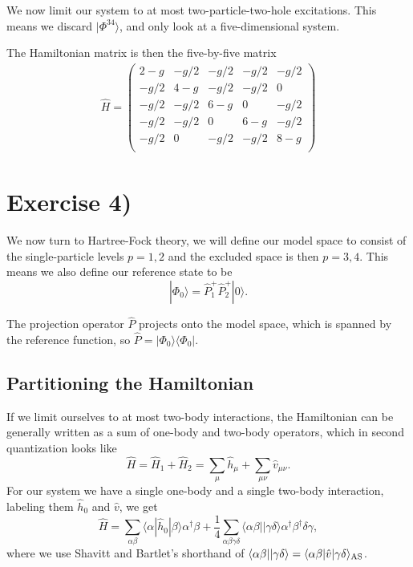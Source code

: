 \documentclass[a4paper, 11pt, notitlepage, english]{article}
\newcommand{\bra}[1]{\langle #1|}
\newcommand{\ket}[1]{|#1 \rangle}
\newcommand{\brakket}[2]{\langle #1 || #2 \rangle}
\newcommand{\op}[1]{\hat{#1}}
\newcommand{\braopket}[3]{\langle #1 | {#2} | #3 \rangle}
\begin{document}
We now limit our system to at most two-particle-two-hole excitations. This means we discard $\ket{\Phi^{34}}$, and only look at a five-dimensional system.

The Hamiltonian matrix is then the five-by-five matrix
\begin{align*}
\op{H} = \begin{pmatrix}
2 - g &  -g/2 & -g/2  & -g/2  & -g/2  \\
-g/2  & 4 - g & -g/2  & -g/2  & 0     \\
-g/2  & -g/2  & 6 - g &	0     & -g/2  \\              
-g/2  & -g/2  & 0     & 6 - g &	-g/2  \\                         
-g/2  &	0	  & -g/2  & -g/2  & 8 - g \\
\end{pmatrix}
\end{align*}

\clearpage

\section*{Exercise 4)}

We now turn to Hartree-Fock theory, we will define our model space to consist of the single-particle levels $p=1,2$ and the excluded space is then $p=3,4$. This means we also define our reference state to be
$$\ket{\Phi_0} = \op{P}_1^+ \op{P}_2^+ \ket{0}.$$

The projection operator $\op{P}$ projects onto the model space, which is spanned by the reference function, so $\op{P} = \ket{\Phi_0}\bra{\Phi_0}$.


\subsection*{Partitioning the Hamiltonian}

If we limit ourselves to at most two-body interactions, the Hamiltonian can be generally written as a sum of one-body and two-body operators, which in second quantization looks like
$$\op{H} = \op{H}_1 + \op{H}_2 = \sum_\mu \op{h}_\mu + \sum_{\mu\nu} \op{v}_{\mu\nu}.$$
For our system we have a single one-body and a single two-body interaction, labeling them $\op{h}_0$ and $\op{v}$, we get
$$\op{H} = \sum_{\alpha\beta} \braopket{\alpha}{\op{h}_0}{\beta}\alpha^\dagger \beta + \frac{1}{4}\sum_{\alpha\beta\gamma\delta}\brakket{\alpha\beta}{\gamma\delta}\alpha^\dagger \beta^\dagger \delta \gamma,$$
where we use Shavitt and Bartlet's shorthand of $\brakket{\alpha\beta}{\gamma\delta} = \braopket{\alpha\beta}{\op{v}}{\gamma\delta}_{\rm AS}$.
\end{document}
